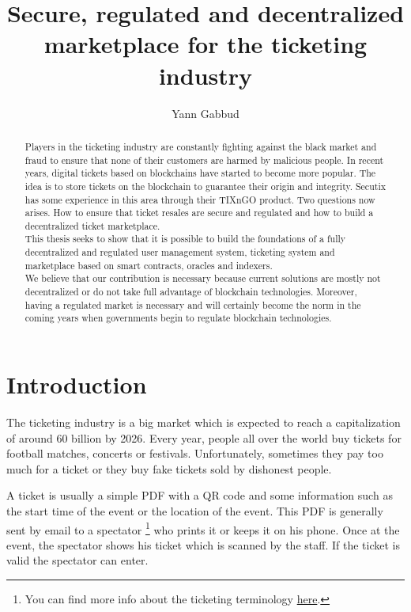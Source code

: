 \documentclass[a4paper,11pt,oneside]{report}
\title{Secure, regulated and decentralized marketplace for the ticketing industry}
\author{Yann Gabbud}
\affiliation{Distributed Computing Laboratory \\
and \\
Secutix SA, an ELCA company \\}
\begin{document}
\maketitle
\makeacks

\begin{abstract}
Players in the ticketing industry are constantly fighting against the black market and fraud to ensure that none of their customers are harmed by malicious people. In recent years, digital tickets based on blockchains have started to become more popular. The idea is to store tickets on the blockchain to guarantee their origin and integrity. Secutix has some experience in this area through their TIXnGO product. Two questions now arises. How to ensure that ticket resales are secure and regulated and how to build a decentralized ticket marketplace. \\

This thesis seeks to show that it is possible to build the foundations of a fully decentralized and regulated user management system, ticketing system and marketplace based on smart contracts, oracles and indexers. \\

We believe that our contribution is necessary because current solutions are mostly not decentralized or do not take full advantage of blockchain technologies. Moreover, having a regulated market is necessary and will certainly become the norm in the coming years when governments begin to regulate blockchain technologies. \\
\end{abstract}

\maketoc

\chapter{Introduction}
The ticketing industry is a big market which is expected to reach a capitalization of around 60 billion by 2026. Every year, people all over the world buy tickets for football matches, concerts or festivals. Unfortunately, sometimes they pay too much for a ticket or they buy fake tickets sold by dishonest people.

A ticket is usually a simple PDF with a QR code and some information such as the start time of the event or the location of the event. This PDF is generally sent by email to a spectator \footnote{You can find more info about the ticketing terminology \hyperref[sec:ticketing_terminology]{here}.} who prints it or keeps it on his phone. Once at the event, the spectator shows his ticket which is scanned by the staff. If the ticket is valid the spectator can enter.
\end{document}

